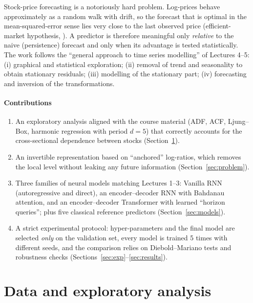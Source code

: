 \documentclass[11pt,a4paper]{article}
\begin{document}
Stock-price forecasting is a notoriously hard problem. Log-prices behave approximately as a random walk with drift, so the forecast that is optimal in the mean-squared-error sense lies very close to the last observed price (efficient-market hypothesis, \cite{fama1970}). A predictor is therefore meaningful only \emph{relative} to the naive (persistence) forecast and only when its advantage is tested statistically. The work follows the ``general approach to time series modelling'' of Lectures 4--5: (i) graphical and statistical exploration; (ii) removal of trend and seasonality to obtain stationary residuals; (iii) modelling of the stationary part; (iv) forecasting and inversion of the transformations.

\paragraph{Contributions}
\begin{enumerate}[leftmargin=*]
  \item An exploratory analysis aligned with the course material (ADF, ACF, Ljung--Box, harmonic regression with period $d=5$) that correctly accounts for the cross-sectional dependence between stocks (Section~\ref{sec:data}).
  \item An invertible representation based on ``anchored'' log-ratios, which removes the local level without leaking any future information (Section~\ref{sec:problem}).
  \item Three families of neural models matching Lectures 1--3: Vanilla RNN (autoregressive and direct), an encoder--decoder RNN with Bahdanau attention, and an encoder--decoder Transformer with learned ``horizon queries''; plus five classical reference predictors (Section~\ref{sec:models}).
  \item A strict experimental protocol: hyper-parameters and the final model are selected \emph{only} on the validation set, every model is trained 5 times with different seeds, and the comparison relies on Diebold--Mariano tests and robustness checks (Sections~\ref{sec:exp}--\ref{sec:results}).
\end{enumerate}

\section{Data and exploratory analysis}
\label{sec:data}
\end{document}
